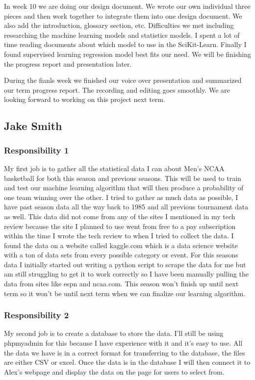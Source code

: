 \documentclass[letterpaper, 10pt,titlepage]{article}
\begin{document}
\par In week 10 we are doing our design document. We wrote our own individual three pieces and then work together to integrate them into one design document. We also add the introduction, glossary section, etc. Difficulties we met including researching the machine learning models and statistics models. I spent a lot of time reading documents about which model to use in the SciKit-Learn. Finally I found supervised learning regression model best fits our need. We will be finishing the progress report and presentation later.

\par During the fianls week we finished our voice over presentation and summarized our term progress report. The recording and editing goes smoothly. We are looking forward to working on this project next term.

\subsection{Jake Smith}
\subsubsection{Responsibility 1}
My first job is to gather all the statistical data I can about Men’s NCAA basketball for both this season and previous seasons. This will be used to train and test our machine learning algorithm that will then produce a probability of one team winning over the other. I tried to gather as much data as possible, I have past season data all the way back to 1985 and all previous tournament data as well. This data did not come from any of the sites I mentioned in my tech review because the site I planned to use went from free to a pay subscription within the time I wrote the tech review to when I tried to collect the data. I found the data on a website called kaggle.com which is a data science website with a ton of data sets from every possible category or event. For this seasons data I initially started out writing a python script to scrape the data for me but am still struggling to get it to work correctly so I have been manually pulling the data from sites like espn and ncaa.com. This season won’t finish up until next term so it won’t be until next term when we can finalize our learning algorithm.
\subsubsection{Responsibility 2}
My second job is to create a database to store the data. I’ll still be using phpmyadmin for this because I have experience with it and it’s easy to use. All the data we have is in a correct format for transferring to the database, the files are either CSV or excel. Once the data is in the database I will then connect it to Alex’s webpage and display the data on the page for users to select from.
\end{document}
